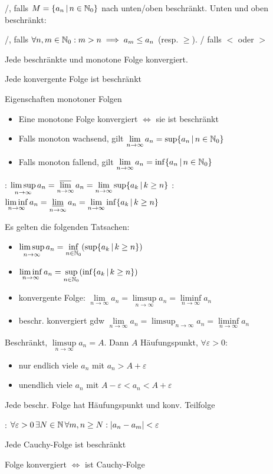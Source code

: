 \Def {}/, falls $M = \{a_n \, | \, n \in \mathbb{N}_0\}$
nach unten/oben beschränkt. Unten und oben beschränkt: 

\Def {}/,
falls $\forall n,m \in \mathbb{N}_0 : m > n \implies a_m\le a_n$ (resp. $\geq$).
/ falls $<$ oder $>$

\Satz Jede beschränkte und monotone Folge konvergiert.

\Satz Jede konvergente Folge ist beschränkt

\Satz Eigenschaften monotoner Folgen
\vspace{-0.6em}
\begin{itemize}
    \item Eine monotone Folge konvergiert $\iff$ sie ist beschränkt
    \item Falls monoton wachsend, gilt $\lim\limits_{n\to\infty}a_n = \sup\{a_n \, | \, n \in \mathbb{N}_0\}$
    \item Falls monoton fallend, gilt $\lim\limits_{n\to\infty}a_n = \inf\{a_n \, | \, n \in \mathbb{N}_0\}$
\end{itemize}

\Def {}: $\limsup\limits_{n\to\infty} a_n = \varlimsup\limits_{n\to\infty} a_n = \lim\limits_{n\to\infty} \sup\{a_k \, | \, k\ge n\}$
: $\liminf\limits_{n\to\infty} a_n = \varliminf\limits_{n \to \infty} a_n = \lim\limits_{n\to\infty} \inf\{a_k \, | \, k\ge n\}$

\Satz Es gelten die folgenden Tatsachen:
\vspace{-0.6em}
\begin{itemize}
    \item $\limsup\limits_{n\to\infty} a_n = \inf\limits_{n\in\mathbb{N}_0}(\sup\{a_k \, | \, k\ge n\})$
    \item $\liminf\limits_{n\to\infty} a_n = \sup\limits_{n\in\mathbb{N}_0}(\inf\{a_k \, | \, k\ge n\})$
    \item konvergente Folge: $\lim\limits_{n\to\infty} a_n = \limsup\limits_{n\to\infty} a_n = \liminf\limits_{n\to\infty} a_n$
    \item beschr. konvergiert gdw $\lim\limits_{n\to\infty}a_n = \limsup_{n\to\infty} a_n = \liminf\limits_{n\to\infty} a_n$
\end{itemize}

\Satz Beschränkt, $\limsup\limits_{n\to\infty}a_n = A$. Dann $A$ Häufungspunkt,  $\forall\varepsilon > 0$:
\vspace{-0.6em}
\begin{itemize}
    \item nur endlich viele $a_n$ mit $a_n > A + \varepsilon$
    \item unendlich viele $a_n$ mit $A - \varepsilon < a_n < A + \varepsilon$
\end{itemize}

\Kor Jede beschr. Folge hat Häufungspunkt und konv. Teilfolge

\Def {}: $\forall \varepsilon > 0 \, \exists N \in \mathbb{N} \, \forall m, n\ge N : |a_n - a_m| < \varepsilon$

\Satz Jede Cauchy-Folge ist beschränkt

\Satz Folge konvergiert $\iff$ ist Cauchy-Folge
